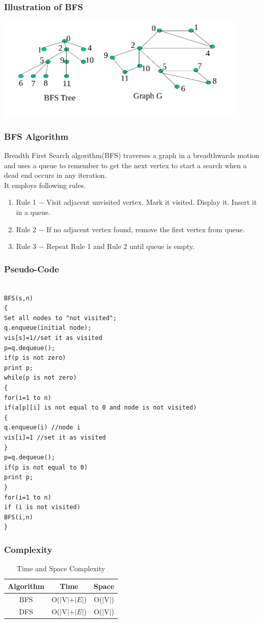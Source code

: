 \documentclass{beamer}
\begin{document}
\begin{frame}
\frametitle{Illustration of BFS}
\includegraphics[width = 12cm]{bfs}
\end{frame}

\begin{frame}
\frametitle{BFS Algorithm}
Breadth First Search algorithm(BFS) traverses a graph in a breadthwards motion and uses a queue to remember to get the next vertex to start a search when a dead end occurs in any iteration. \\It employs following rules.
\begin{enumerate}

\item     Rule 1 − Visit adjacent unvisited vertex. Mark it visited. Display it. Insert it in a queue.

\item    Rule 2 − If no adjacent vertex found, remove the first vertex from queue.

\item     Rule 3 − Repeat Rule 1 and Rule 2 until queue is empty.
\end{enumerate}
\end{frame}

\begin{frame}[fragile]
\frametitle{Pseudo-Code}
\begin{lstlisting}

BFS(s,n)
{
Set all nodes to "not visited";
q.enqueue(initial node);
vis[s]=1//set it as visited
p=q.dequeue();
if(p is not zero)
print p;
while(p is not zero)
{
for(i=1 to n)
if(a[p][i] is not equal to 0 and node is not visited)
{
q.enqueue(i) //node i
vis[i]=1 //set it as visited
}
p=q.dequeue();
if(p is not equal to 0)
print p;
}
for(i=1 to n)
if (i is not visited)
BFS(i,n)
}

\end{lstlisting}
\end{frame}
\begin{frame}
\frametitle{Complexity}
\begin{table}[h!]
\begin{center}
\begin{tabular}{|c|c|c|}
\hline
Algorithm & Time & Space\\
\hline
BFS & O($|$V$|+|E|$)&O($|$V$|$) \\
\hline
DFS & O($|$V$|+|E|$)&O($|$V$|$) \\
\hline
\end{tabular}
\caption{Time and Space Complexity}
\end{center}
\end{table}

\end{frame}
\end{document}
